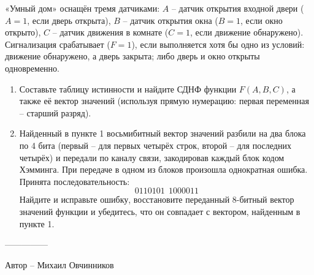 \question
«Умный дом» оснащён тремя датчиками: $A$ -- датчик открытия входной двери ($A=1$, если дверь открыта), $B$ -- датчик открытия окна ($B=1$, если окно открыто), $C$ -- датчик движения в комнате ($C=1$, если движение обнаружено). Сигнализация срабатывает ($F=1$), если выполняется хотя бы одно из условий: движение обнаружено, а дверь закрыта; либо дверь и окно открыты одновременно.

\begin{enumerate}
\item Составьте таблицу истинности и найдите СДНФ функции $F(A,B,C)$, а также её вектор значений (используя прямую нумерацию: первая переменная -- старший разряд).
\item Найденный в пункте 1 восьмибитный вектор значений разбили на два блока по 4 бита (первый -- для первых четырёх строк, второй -- для последних четырёх) и передали по каналу связи, закодировав каждый блок кодом Хэмминга. При передаче в одном из блоков произошла однократная ошибка. Принята последовательность:
\[
0110101\ \ 1000011
\]
Найдите и исправьте ошибку, восстановите переданный 8-битный вектор значений функции и убедитесь, что он совпадает с вектором, найденным в пункте 1.
\end{enumerate}
---------------

Автор -- Михаил Овчинников